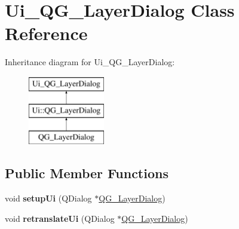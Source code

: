 \hypertarget{classUi__QG__LayerDialog}{\section{Ui\-\_\-\-Q\-G\-\_\-\-Layer\-Dialog Class Reference}
\label{classUi__QG__LayerDialog}
}
Inheritance diagram for Ui\-\_\-\-Q\-G\-\_\-\-Layer\-Dialog\-:\begin{figure}[H]
\begin{center}
\leavevmode
\includegraphics[height=3.000000cm]{classUi__QG__LayerDialog}
\end{center}
\end{figure}
\subsection*{Public Member Functions}
\begin{DoxyCompactItemize}
\item 
\hypertarget{classUi__QG__LayerDialog_ad4ea9491efeae926b5ccd5dd6edec006}{void {\bfseries setup\-Ui} (Q\-Dialog $\ast$\hyperlink{classQG__LayerDialog}{Q\-G\-\_\-\-Layer\-Dialog})}\label{classUi__QG__LayerDialog_ad4ea9491efeae926b5ccd5dd6edec006}

\item 
\hypertarget{classUi__QG__LayerDialog_a41b6e23b720310c70da65d156c5ea037}{void {\bfseries retranslate\-Ui} (Q\-Dialog $\ast$\hyperlink{classQG__LayerDialog}{Q\-G\-\_\-\-Layer\-Dialog})}\label{classUi__QG__LayerDialog_a41b6e23b720310c70da65d156c5ea037}

\end{DoxyCompactItemize}
